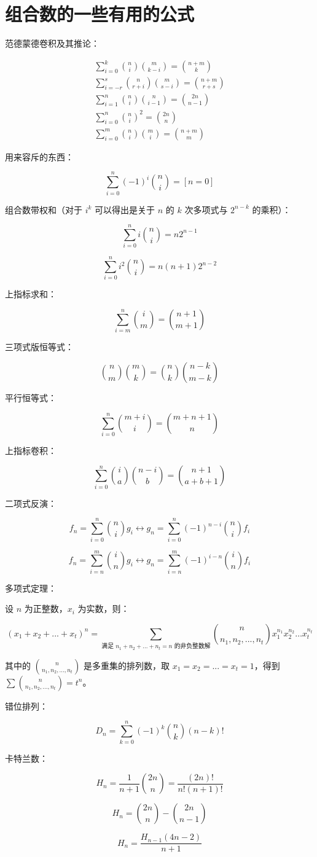 \section{组合数的一些有用的公式}

范德蒙德卷积及其推论：

$$
\begin{aligned}
\sum_{i=0}^k \binom{n}{i}\binom{m}{k-i}=\binom{n+m}{k} \\
\sum_{i=-r}^s \binom{n}{r+i}\binom{m}{s-i}=\binom{n+m}{r+s} \\
\sum_{i=1}^n \binom{n}{i}\binom{n}{i-1}=\binom{2n}{n-1} \\
\sum_{i=0}^n \binom{n}{i}^2=\binom{2n}{n} \\
\sum_{i=0}^m \binom{n}{i}\binom{m}{i}=\binom{n+m}{m}
\end{aligned}
$$

用来容斥的东西：

$$\sum_{i=0}^n (-1)^i \binom{n}{i}=[n=0]$$

组合数带权和（对于 $i^k$ 可以得出是关于 $n$ 的 $k$ 次多项式与 $2^{n-k}$ 的乘积）：

$$\sum_{i=0}^n i \binom{n}{i}=n2^{n-1}$$

$$\sum_{i=0}^n i^2 \binom{n}{i}=n(n+1)2^{n-2}$$

上指标求和：

$$\sum_{i=m}^n \binom{i}{m}=\binom{n+1}{m+1}$$

三项式版恒等式：

$$\binom{n}{m}\binom{m}{k}=\binom{n}{k}\binom{n-k}{m-k}$$

平行恒等式：

$$\sum_{i=0}^n \binom{m+i}{i}=\binom{m+n+1}{n}$$

上指标卷积：

$$\sum_{i=0}^n \binom{i}{a}\binom{n-i}{b}=\binom{n+1}{a+b+1}$$

二项式反演：

$$f_n=\sum_{i=0}^n \binom{n}{i}g_i \leftrightarrow g_n=\sum_{i=0}^n (-1)^{n-i} \binom{n}{i} f_i$$

$$f_n=\sum_{i=n}^m \binom{i}{n} g_i \leftrightarrow g_n=\sum_{i=n}^m (-1)^{i-n}\binom{i}{n}f_i$$

多项式定理：

设 $n$ 为正整数，$x_i$ 为实数，则：

$$(x_1+x_2+...+x_t)^n=\sum_{\text{满足 $n_1+n_2+...+n_t=n$ 的非负整数解}} \binom{n}{n_1,n_2,...,n_t}x_1^{n_1}x_2^{n_2}\dots x_t^{n_t}$$

其中的 $\binom{n}{n_1,n_2,...,n_t}$ 是多重集的排列数，取 $x_1=x_2=...=x_t=1$，得到 $\sum \binom{n}{n_1,n_2,...,n_t}=t^n$。

错位排列：

$$D_n=\sum_{k=0}^n(-1)^k\binom{n}{k}(n-k)!$$

卡特兰数：

$$H_n=\frac{1}{n+1}\binom{2n}{n}=\frac{(2n)!}{n!(n+1)!}$$

$$H_n=\binom{2n}{n}-\binom{2n}{n-1}$$

$$H_n=\frac{H_{n-1}(4n-2)}{n+1}$$


